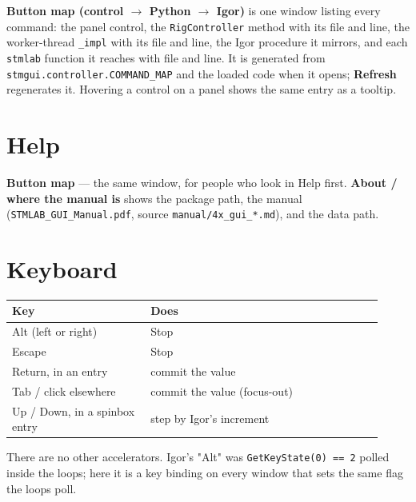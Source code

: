 \textbf{Button map (control $\rightarrow$ Python $\rightarrow$ Igor)} is one window listing every command: the panel control, the \texttt{Rig\discretionary{}{}{}Controller} method with its file and line, the worker-thread \texttt{\_\discretionary{}{}{}impl} with its file and line, the Igor procedure it mirrors, and each \texttt{stmlab} function it reaches with file and line. It is generated from \texttt{stmgui.\discretionary{}{}{}controller.\discretionary{}{}{}COMMAND\_\discretionary{}{}{}MAP} and the loaded code when it opens; \textbf{Refresh} regenerates it. Hovering a control on a panel shows the same entry as a tooltip.

\section{Help}

\textbf{Button map} --- the same window, for people who look in Help first. \textbf{About / where the manual is} shows the package path, the manual (\texttt{STMLAB\_\discretionary{}{}{}GUI\_\discretionary{}{}{}Manual.\discretionary{}{}{}pdf}, source \texttt{manual/\discretionary{}{}{}4x\_\discretionary{}{}{}gui\_\discretionary{}{}{}*.\discretionary{}{}{}md}), and the data path.

\section{Keyboard}

\small\setlength{\LTleft}{0pt}\setlength{\LTright}{\fill}
\begin{longtable}{@{}>{\raggedright\arraybackslash}p{0.34\linewidth}>{\raggedright\arraybackslash}p{0.58\linewidth}@{}}
\toprule
\textbf{Key} & \textbf{Does} \\
\midrule\endhead
Alt (left or right) & Stop \\
Escape & Stop \\
Return, in an entry & commit the value \\
Tab / click elsewhere & commit the value (focus-out) \\
Up / Down, in a spinbox entry & step by Igor's increment \\
\bottomrule
\end{longtable}
\normalsize

There are no other accelerators. Igor's "Alt" was \texttt{Get\discretionary{}{}{}Key\discretionary{}{}{}State(0) == 2} polled inside the loops; here it is a key binding on every window that sets the same flag the loops poll.

